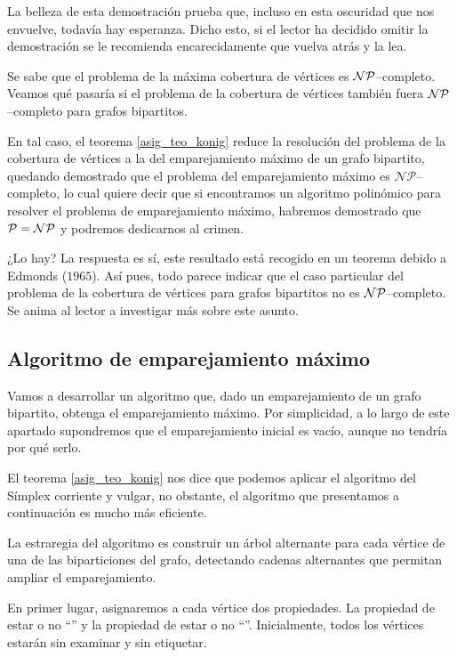 La belleza de esta demostración prueba que, incluso en esta oscuridad que nos envuelve, todavía hay esperanza. Dicho esto, si el lector ha decidido omitir la demostración se le recomienda encarecidamente que vuelva atrás y la lea.
\begin{obs}[$\mc{NP}$--completitud]
	Se sabe que el problema de la máxima cobertura de vértices es $\mc{NP}$--completo. Veamos qué pasaría si el problema de la cobertura de vértices también fuera $\mc{NP}$--completo para grafos bipartitos.
	
	En tal caso, el teorema \ref{asig_teo_konig} reduce la resolución del problema de la cobertura de vértices a la del emparejamiento máximo de un grafo bipartito, quedando demostrado que el problema del emparejamiento máximo es $\mathcal{NP}$--completo, lo cual quiere decir que si encontramos un algoritmo polinómico para resolver el problema de emparejamiento máximo, habremos demostrado que $\mathcal{P}=\mathcal{NP}$ y podremos dedicarnos al crimen.
	
	¿Lo hay? La respuesta es sí, este resultado está recogido en un teorema debido a Edmonds ($1965$). Así pues, todo parece indicar que el caso particular del problema de la cobertura de vértices para grafos bipartitos no es $\mc{NP}$--completo. Se anima al lector a investigar más sobre este asunto.
\end{obs}
\subsection{Algoritmo de emparejamiento máximo}
Vamos a desarrollar un algoritmo que, dado un emparejamiento de un grafo bipartito, obtenga el emparejamiento máximo. Por simplicidad, a lo largo de este apartado supondremos que el emparejamiento inicial es vacío, aunque no tendría por qué serlo.

\begin{obs}
	El teorema \ref{asig_teo_konig} nos dice que podemos aplicar el algoritmo del Símplex corriente y vulgar, no obstante, el algoritmo que presentamos a continuación es mucho más eficiente.
\end{obs}

La estraregia del algoritmo es construir un árbol alternante para cada vértice de una de las biparticiones del grafo, detectando cadenas alternantes que permitan ampliar el emparejamiento.

En primer lugar, asignaremos a cada vértice dos propiedades. La propiedad de estar o no ``'' y la propiedad de estar o no ``''. Inicialmente, todos los vértices estarán sin examinar y sin etiquetar.

